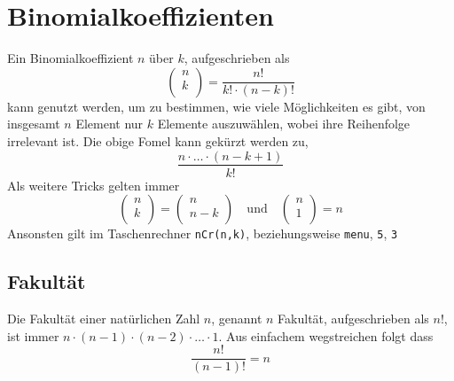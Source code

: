 \documentclass{article}
\begin{document}
 
\newcommand{\bink}[2]{
\begin{pmatrix}
 #1 \\
 #2 \\
\end{pmatrix} 
} 
 
\section{Binomialkoeffizienten}  
Ein Binomialkoeffizient $n$ über $k$, aufgeschrieben als
\[ 
\bink{n}{k} 
= \frac{n!}{k! \cdot (n-k)!} 
\]
kann genutzt werden, um zu bestimmen, wie viele Möglichkeiten es gibt, von insgesamt $n$ Element nur $k$ Elemente auszuwählen, wobei ihre Reihenfolge irrelevant ist. Die obige Fomel kann gekürzt werden zu,
\[
 \frac{n \cdot \ldots \cdot (n-k+1)}{k!}
\]  
Als weitere Tricks gelten immer
\[
\bink{n}{k} = \bink{n}{n-k}
\quad \text{und} \quad
\bink{n}{1} = n 
\]
Ansonsten gilt im Taschenrechner \texttt{nCr(n,k)}, beziehungsweise \texttt{menu}, \texttt{5}, \texttt{3} 
 
\subsection{Fakultät}
Die Fakultät einer natürlichen Zahl $n$, genannt $n$ Fakultät, aufgeschrieben als $n!$, ist immer $n \cdot (n-1) \cdot (n-2) \cdot \ldots \cdot 1$. Aus einfachem wegstreichen folgt dass
\[
 \frac{n!}{(n-1)!} = n
\] 
\end{document}
